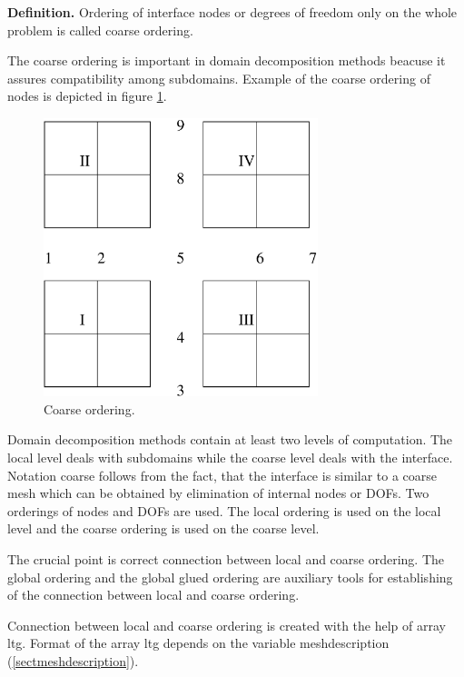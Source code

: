\noindent
{\bf Definition.}
Ordering of interface nodes or degrees of freedom only on the whole problem is called
coarse  ordering.

\noindent
The coarse ordering is important in domain decomposition methods beacuse it assures
compatibility among subdomains.
Example of the coarse ordering of nodes is depicted in figure \ref{figmeshcoarseord}.

\begin{figure}[h]
\begin{center}
\includegraphics[width=80mm]{FIG/meshcoarseord.eps}
\caption{Coarse ordering.}
\label{figmeshcoarseord}
\end{center}
\end{figure}


Domain decomposition methods contain at least two levels of computation. The local
level deals with subdomains while the coarse level deals with the interface.
Notation coarse follows from the fact, that the interface is similar to a coarse
mesh which can be obtained by elimination of internal nodes or DOFs.
Two orderings of nodes and DOFs are used. The local ordering is used on the local
level and the coarse ordering is used on the coarse level.

The crucial point is correct connection between local and coarse ordering.
The global ordering and the global glued ordering are auxiliary tools for
establishing of the connection between local and coarse ordering.


Connection between local and coarse ordering is created with the help of
 array ltg.
Format of the array ltg depends on the variable meshdescription (\ref{sectmeshdescription}).


